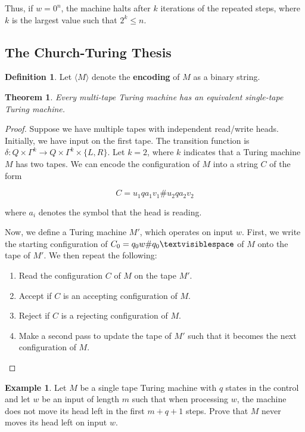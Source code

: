 \documentclass[11pt]{article}
\theoremstyle{plain} %
\newtheorem*{theorem}{Theorem}
\theoremstyle{definition}
\newtheorem*{definition}{Definition} %
\theoremstyle{example}
\newtheorem*{example}{Example}
\theoremstyle{remark}
\begin{document}
Thus, if $w = 0^n$, the machine halts after $k$ iterations of the repeated steps, where $k$ is the largest value such that $2^k \leq n$.



\subsection{The Church-Turing Thesis}

\begin{definition}
Let $\langle M\rangle$ denote the \textbf{encoding} of $M$ as a binary string.
\end{definition}

\begin{theorem}
Every multi-tape Turing machine has an equivalent single-tape Turing machine.
\end{theorem}



\begin{proof}Suppose we have multiple tapes with independent read/write heads. Initially, we have input on the first tape. The transition function is $\delta : Q \times \Gamma^k \rightarrow Q \times \Gamma^k \times \{L,R\} $. Let $k = 2$, where $k$ indicates that a Turing machine $M$ has two tapes. We can encode the configuration of $M$ into a string $C$ of the form

$$C = u_1qa_1v_1\#u_2qa_2v_2$$

where $a_i$ denotes the symbol that the head is reading. 

Now, we define a Turing machine $M'$, which operates on input $w$. First, we write the starting configuration of $C_0 = q_0w \#q_0\textvisiblespace$ of $M$ onto the tape of $M'$. We then repeat the following:

\begin{enumerate}
	\item Read the configuration $C$ of $M$ on the tape $M'$.
	\item Accept if $C$ is an accepting configuration of $M$.
	\item Reject if $C$ is a rejecting configuration of $M$.
	\item Make a second pass to update the tape of $M'$ such that it becomes the next configuration of $M$.
\end{enumerate}
\end{proof}

\begin{example}
Let $M$ be a single tape Turing machine with $q$ states in the control and let $w$ be an input of length $m$ such that when processing $w$, the machine does not move its head left in the first $m+q+1$ steps. Prove that $M$ never moves its head left on input $w$.
\end{example}
\end{document}
